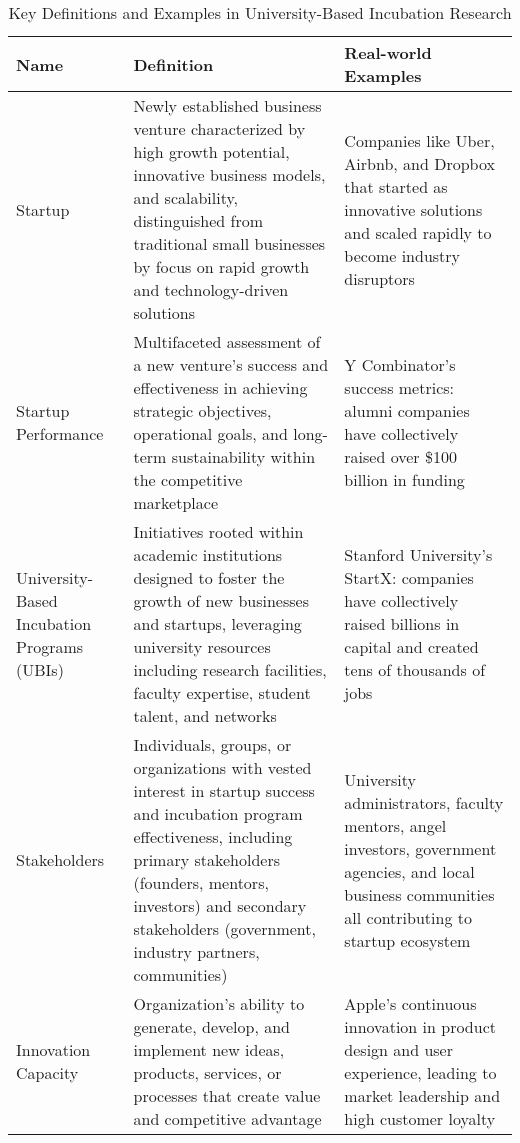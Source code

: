 \documentclass[../Main.tex]{subfiles}
\begin{document}
\begin{table}[h]
\centering
\caption{Key Definitions and Examples in University-Based Incubation Research}
\label{tab:key_definitions}
\begin{tabular}{|p{2.5cm}|p{6cm}|p{5cm}|}
\hline
\textbf{Name} & \textbf{Definition} & \textbf{Real-world Examples} \\
\hline
Startup & Newly established business venture characterized by high growth potential, innovative business models, and scalability, distinguished from traditional small businesses by focus on rapid growth and technology-driven solutions \cite{blank2013startup, ries2011lean} & Companies like Uber, Airbnb, and Dropbox that started as innovative solutions and scaled rapidly to become industry disruptors \\
\hline
Startup Performance & Multifaceted assessment of a new venture's success and effectiveness in achieving strategic objectives, operational goals, and long-term sustainability within the competitive marketplace \cite{patton2014realising, barbero2012revisiting} & Y Combinator's success metrics: alumni companies have collectively raised over \$100 billion in funding \cite{YCombinator2024} \\
\hline
University-Based Incubation Programs (UBIs) & Initiatives rooted within academic institutions designed to foster the growth of new businesses and startups, leveraging university resources including research facilities, faculty expertise, student talent, and networks \cite{grimaldi2005university, siegel2003assessing} & Stanford University's StartX: companies have collectively raised billions in capital and created tens of thousands of jobs \cite{StartX2024} \\
\hline
Stakeholders & Individuals, groups, or organizations with vested interest in startup success and incubation program effectiveness, including primary stakeholders (founders, mentors, investors) and secondary stakeholders (government, industry partners, communities) \cite{freeman1984strategic, mitchell1997toward} & University administrators, faculty mentors, angel investors, government agencies, and local business communities all contributing to startup ecosystem \\
\hline
Innovation Capacity & Organization's ability to generate, develop, and implement new ideas, products, services, or processes that create value and competitive advantage \cite{lawson2001developing, hurley1998innovation} & Apple's continuous innovation in product design and user experience, leading to market leadership and high customer loyalty \\

\end{tabular}
\end{table}
\end{document}
